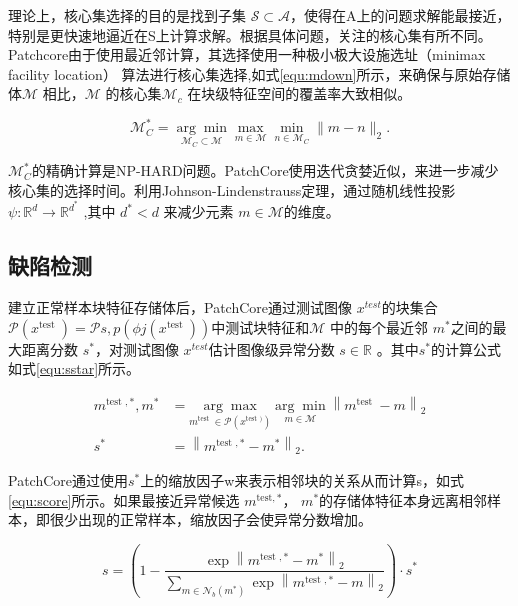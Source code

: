 理论上，核心集选择的目的是找到子集 $\mathcal{S} \subset \mathcal{A}$，使得在A上的问题求解能最接近，特别是更快速地逼近在S上计算求解。根据具体问题，关注的核心集有所不同。Patchcore由于使用最近邻计算，其选择使用一种极小极大设施选址（minimax facility location） 算法进行核心集选择,如式\ref{equ:mdown}所示，来确保与原始存储体$\mathcal{M}$ 相比，$\mathcal{M}$ 的核心集$\mathcal{M}_c$ 在块级特征空间的覆盖率大致相似。

\begin{equation}\label{equ:mdown}
    \mathcal{M}_{C}^{*}=\underset{\mathcal{M}_{C} \subset \mathcal{M}}{\arg \min } \max _{m \in \mathcal{M}} \min _{n \in \mathcal{M}_{C}}\|m-n\|_{2} .
\end{equation}

$\mathcal{M}_{C}^{*}$的精确计算是NP-HARD问题。PatchCore使用迭代贪婪近似，来进一步减少核心集的选择时间。利用Johnson-Lindenstrauss定理，通过随机线性投影 $\psi: \mathbb{R}^{d} \rightarrow \mathbb{R}^{d^{*}}$   ,其中 $d^{*}<d$  来减少元素 $m \in \mathcal{M}$的维度。



\subsection{缺陷检测}
建立正常样本块特征存储体后，PatchCore通过测试图像 $x^{test}$的块集合 $\mathcal{P}\left(x^{\text {test }}\right)=\mathcal{P}{s, p}\left(\phi{j}\left(x^{\text {test }}\right)\right)$中测试块特征和$\mathcal{M}$ 中的每个最近邻 $m^{*}$之间的最大距离分数 $s^{*}$，对测试图像 $x^{test}$估计图像级异常分数 $s \in \mathbb{R}$ 。其中$s^{*}$的计算公式如式\ref{equ:sstar}所示。

\begin{equation}\label{equ:sstar}
    \begin{aligned}m^{\text {test }, *}, m^{*} & =\underset{m^{\text {test }} \in \mathcal{P}\left(x^{\text {test })}\right)}{\arg \max } \underset{m \in \mathcal{M}}{\arg \min }\left\|m^{\text {test }}-m\right\|_{2} \\s^{*} & =\left\|m^{\text {test }, *}-m^{*}\right\|_{2} .\end{aligned}
\end{equation}


PatchCore通过使用$s^{*}$上的缩放因子w来表示相邻块的关系从而计算s，如式\ref{equ:score}所示。如果最接近异常候选 $m^{\text {test},* }$， $m^{*}$的存储体特征本身远离相邻样本，即很少出现的正常样本，缩放因子会使异常分数增加。

\begin{equation}\label{equ:score}
    s=\left(1-\frac{\exp \left\|m^{\text {test }, *}-m^{*}\right\|_{2}}{\sum_{m \in \mathcal{N}_{b}\left(m^{*}\right)} \exp \left\|m^{\text {test }, *}-m\right\|_{2}}\right) \cdot s^{*}
\end{equation}

